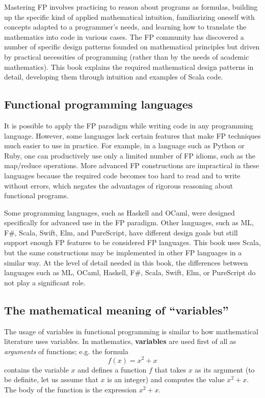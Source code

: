Mastering FP involves practicing to reason about programs as formulas,
building up the specific kind of applied mathematical intuition, familiarizing
oneself with concepts adapted to a programmer's needs, and learning
how to translate the mathematics into code in various cases. The FP
community has discovered a number of specific design patterns founded
on mathematical principles but driven by practical necessities of
programming (rather than by the needs of academic mathematics). This
book explains the required mathematical design patterns in detail,
developing them through intuition and examples of Scala code.

\subsection{Functional programming languages}

It is possible to apply the FP paradigm while writing code in any
programming language. However, some languages lack certain features
that make FP techniques much easier to use in practice. For example,
in a language such as Python or Ruby, one can productively use only
a limited number of FP idioms, such as the map/reduce operations.
More advanced FP constructions are impractical in these languages
because the required code becomes too hard to read and to write without
errors, which negates the advantages of rigorous reasoning about functional
programs.

Some programming languages, such as Haskell and OCaml, were designed
specifically for advanced use in the FP paradigm. Other languages,
such as ML, F\#, Scala, Swift, Elm, and PureScript, have different
design goals but still support enough FP features to be considered
FP languages. This book uses Scala, but the same constructions may
be implemented in other FP languages in a similar way. At the level
of detail needed in this book, the differences between languages such
as ML, OCaml, Haskell, F\#, Scala, Swift, Elm, or PureScript do not
play a significant role.

\subsection{The mathematical meaning of ``variables''}

The usage of variables in functional programming is similar to how
mathematical literature uses variables. In mathematics, \textbf{variables}
are used first of all as \emph{arguments} of functions; e.g. the formula
\[
f(x)=x^{2}+x
\]
contains the variable $x$ and defines a function $f$ that takes
$x$ as its argument (to be definite, let us assume that $x$ is an
integer) and computes the value $x^{2}+x$. The body of the function
is the expression $x^{2}+x$. 

